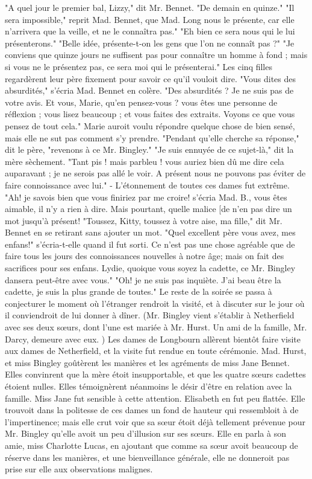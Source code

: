 "A quel jour le premier bal, Lizzy," dit Mr. Bennet.
"De demain en quinze."
"Il sera impossible," reprit Mad. Bennet,\setcounter{page}{378} que Mad. Long nous le présente, car elle n’arrivera que la veille, et ne le connaîtra pas."
"Eh bien ce sera nous qui le lui présenterons."
"Belle idée, présente-t-on les gens que l’on ne connaît pas ?"
"Je conviens que quinze jours ne suffisent pas pour connaître un homme à fond ; mais si vous ne le présentez pas, ce sera moi qui le présenterai."
Les cinq filles regardèrent leur père fixement pour savoir ce qu’il vouloit dire.
"Vous dites des absurdités," s’écria Mad. Bennet en colère.
"Des absurdités ? Je ne suis pas de votre avis. Et vous, Marie, qu’en pensez-vous ? vous êtes une personne de réflexion ; vous lisez beaucoup ; et vous faites des extraits. Voyons ce que vous pensez de tout cela."
Marie auroit voulu répondre quelque chose de bien sensé, mais elle ne sut pas comment s’y prendre.
"Pendant qu’elle cherche sa réponse," dit le père, "revenons à ce Mr. Bingley."
"Je suis ennuyée de ce sujet-là," dit la mère sèchement.
"Tant pis ! mais parbleu ! vous auriez bien dû me dire cela auparavant ; je ne serois\setcounter{page}{379} pas allé le voir. A présent nous ne pouvons pas éviter de faire connoissance avec lui."
- L'étonnement de toutes ces dames fut extrême.
"Ah! je savois bien que vous finiriez par me croire! s'écria Mad. B., vous êtes aimable, il n'y a rien à dire. Mais pourtant, quelle malice [de n'en pas dire un mot jusqu'à présent!
"Toussez, Kitty, toussez à votre aise, ma fille," dit Mr. Bennet en se retirant sans ajouter un mot.
"Quel excellent père vous avez, mes enfans!" s'écria-t-elle quand il fut sorti. Ce n'est pas une chose agréable que de faire tous les jours des connoissances nouvelles à notre âge; mais on fait des sacrifices pour ses enfans. Lydie, quoique vous soyez la cadette, ce Mr. Bingley dansera peut-être avec vous."
"Oh! je ne suis pas inquiète. J'ai beau être la cadette, je suis la plus grande de toutes."
Le reste de la soirée se passa à conjecturer le moment où l'étranger rendroit la visité, et à discuter sur le jour où il conviendroit de lui donner à dîner.
(Mr. Bingley vient s'établir à Netherfield\setcounter{page}{380} avec ses deux sœurs, dont l'une est mariée à Mr. Hurst. Un ami de la famille, Mr. Darcy, demeure avec eux. )
Les dames de Longbourn allèrent bientôt faire visite aux dames de Netherfield, et la visite fut rendue en toute cérémonie. Mad. Hurst, et miss Bingley goûtèrent les manières et les agréments de miss Jane Bennet. Elles convinrent que la mère étoit insupportable, et que les quatre sœurs cadettes étoient nulles. Elles témoignèrent néanmoins le désir d'être en relation avec la famille. Miss Jane fut sensible à cette attention. Elisabeth en fut peu flattée. Elle trouvoit dans la politesse de ces dames un fond de hauteur qui ressembloit à de l'impertinence; mais elle crut voir que sa sœur étoit déjà tellement prévenue pour Mr. Bingley qu'elle avoit un peu d'illusion sur ses sœurs. Elle en parla à son amie, miss Charlotte Lucas, en ajoutant que comme sa sœur avoit beaucoup de réserve dans les manières, et une bienveillance générale, elle ne donneroit pas prise sur elle aux observations malignes.
